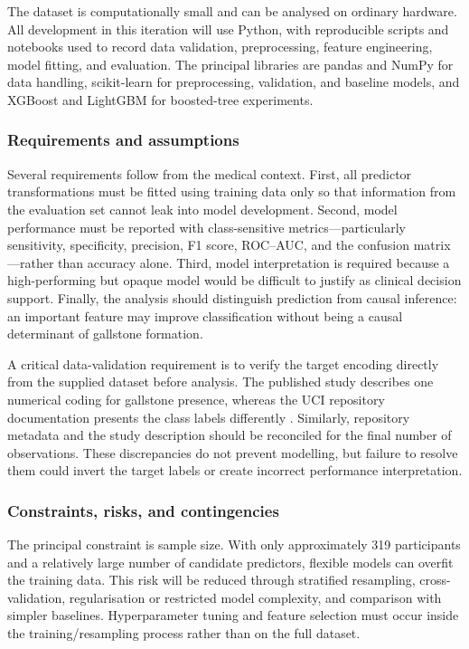 The dataset is computationally small and can be analysed on ordinary hardware. All development in this iteration will use Python, with reproducible scripts and notebooks used to record data validation, preprocessing, feature engineering, model fitting, and evaluation. The principal libraries are pandas and NumPy for data handling, scikit-learn for preprocessing, validation, and baseline models, and XGBoost and LightGBM for boosted-tree experiments.

\subsubsection{Requirements and assumptions}

Several requirements follow from the medical context. First, all predictor transformations must be fitted using training data only so that information from the evaluation set cannot leak into model development. Second, model performance must be reported with class-sensitive metrics---particularly sensitivity, specificity, precision, F1 score, ROC--AUC, and the confusion matrix---rather than accuracy alone. Third, model interpretation is required because a high-performing but opaque model would be difficult to justify as clinical decision support. Finally, the analysis should distinguish prediction from causal inference: an important feature may improve classification without being a causal determinant of gallstone formation.

A critical data-validation requirement is to verify the target encoding directly from the supplied dataset before analysis. The published study describes one numerical coding for gallstone presence, whereas the UCI repository documentation presents the class labels differently \cite{esen2024early,uci2025gallstone}. Similarly, repository metadata and the study description should be reconciled for the final number of observations. These discrepancies do not prevent modelling, but failure to resolve them could invert the target labels or create incorrect performance interpretation.

\subsubsection{Constraints, risks, and contingencies}

The principal constraint is sample size. With only approximately 319 participants and a relatively large number of candidate predictors, flexible models can overfit the training data. This risk will be reduced through stratified resampling, cross-validation, regularisation or restricted model complexity, and comparison with simpler baselines. Hyperparameter tuning and feature selection must occur inside the training/resampling process rather than on the full dataset.

